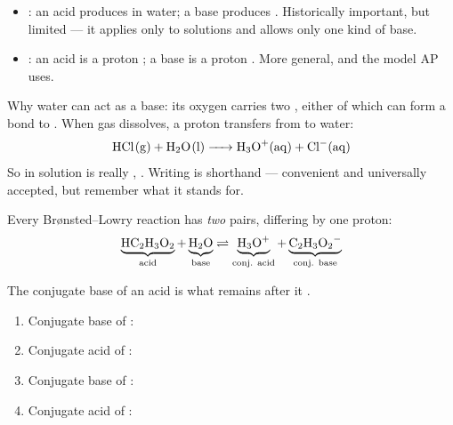 \documentclass{apchem-notes}
\begin{document}
\begin{itemize}[leftmargin=*,itemsep=0.25em]
  \item {}: an acid produces  in
        water; a base produces . Historically
        important, but limited --- it applies only to
         solutions and allows only one kind of
        base.
  \item {}: an acid is a proton
        ; a base is a proton
        . More general, and the model AP uses.
\end{itemize}

\begin{apcnote}
Why water can act as a base: its oxygen carries two
, either of which can form a
bond to . When  gas dissolves, a proton transfers from
 to water:
\[ \ce{HCl(g) + H2O(l) -> H3O+(aq) + Cl^-(aq)} \]
So  in solution is really , . Writing
 is shorthand --- convenient and universally accepted, but remember
what it stands for.
\end{apcnote}


Every Br\o nsted--Lowry reaction has \emph{two} pairs, differing by one
proton:
\[
  \underbrace{\ce{HC2H3O2}}_{\text{acid}} + \underbrace{\ce{H2O}}_{\text{base}}
  \rightleftharpoons
  \underbrace{\ce{H3O+}}_{\text{conj. acid}} + \underbrace{\ce{C2H3O2^-}}_{\text{conj. base}}
\]

The conjugate base of an acid is what remains after it
.


\begin{enumerate}[leftmargin=*,itemsep=0.3em]
  \item Conjugate base of : 
  \item Conjugate acid of : 
  \item Conjugate base of : 
  \item Conjugate acid of : 
\end{enumerate}

\end{document}
